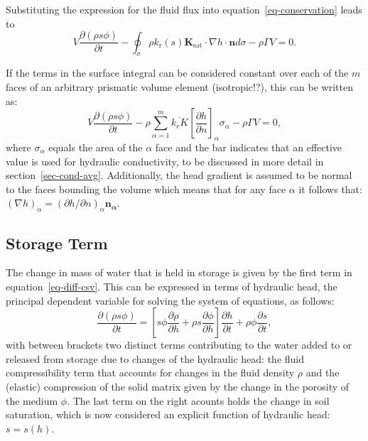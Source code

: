 \documentclass[fleqn]{article}
\begin{document}
Substituting the expression for the fluid flux into equation~\ref{eq-conservation}
leads to
\begin{equation}
  V \frac{\partial (\rho s \phi)}{\partial t} -
  \oint_\sigma \rho k_\text{r}(s) \mathbf{K}_{\textrm{sat}}
  \cdot \nabla h \cdot \mathbf{n} d\sigma -
  \rho \Gamma V = 0.
\end{equation}

If the terms in the surface integral can be considered constant over each of the 
$m$ faces of an arbitrary prismatic volume element (isotropic!?), 
this can be written as:
\begin{equation}
  V \frac{\partial (\rho s \phi)}{\partial t} -
  \rho \sum_{\alpha=1}^{m} \overline{k_r K}
  \left[\frac{\partial h}{\partial n}\right]_\alpha \sigma_\alpha -
  \rho \Gamma V = 0,
  \label{eq-diff-csv}
\end{equation}
where $\sigma_\alpha$ equals the area of the $\alpha$ face and the bar indicates 
that an effective value is used for hydraulic conductivity, to be discussed 
in more detail in section~\ref{sec-cond-avg}. Additionally, the head 
gradient is assumed to be normal to the faces bounding the volume which
means that for any face $\alpha$ it follows that:
$(\nabla h)_\alpha = (\partial h/\partial n)_\alpha \mathbf{n_\alpha}$.

\subsection{Storage Term}
The change in mass of water that is held in storage is given by the first 
term in equation~\ref{eq-diff-csv}. This can be expressed in terms of hydraulic
head, the principal dependent variable for solving the system of equations,
as follows:
\begin{equation}
  \frac{\partial (\rho s \phi)}{\partial t} =
  \left[
    s \phi \frac{\partial \rho}{\partial h} +
    \rho s \frac{\partial \phi}{\partial h}
  \right]
  \frac{\partial h}{\partial t} +  
  \rho \phi \frac{\partial s}{\partial t},
  \label{eq-sto-terms}
\end{equation}
with between brackets two distinct terms contributing to the water
added to or released from storage due to changes of the hydraulic
head: the fluid compressibility term that accounts for changes in the
fluid density $\rho$ and the (elastic) compression of the solid matrix
given by the change in the porosity of the medium $\phi$. The last
term on the right acounts holds the change in soil saturation, which
is now considered an explicit function of hydraulic head: $s = s(h)$.
\end{document}

